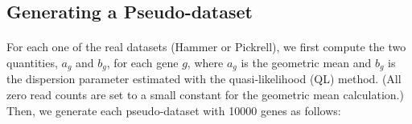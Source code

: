 \documentclass[10pt]{article}
\begin{document}
\subsection*{Generating a Pseudo-dataset}

\paragraph{} \indent For each one of the real datasets (Hammer or Pickrell), we first compute the two quantities, $a_g$ and $b_g$, for each gene $g$, where $a_g$ is the geometric mean and $b_g$ is the dispersion parameter estimated with the quasi-likelihood (QL) method. (All zero read counts are set to a small constant for the geometric mean calculation.) Then, we generate each pseudo-dataset with 10000 genes as follows:
\end{document}

